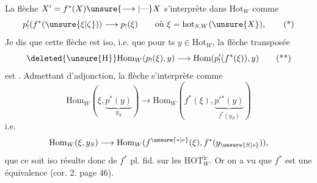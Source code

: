 
La flèche $X'=f^*(X)\unsure{\longrightarrow|\text{---}}X$ s'interprète dans $\mathrm{Hot}_W$ comme
\[
p'_!(f^*(\unsure{\xi|\zeta}))\longrightarrow p_!(\xi)\qquad\text{où }\xi=\mathrm{hot}_{S,W}(\unsure{X}),\tag*{(*)}
\]
Je dis que cette flèche est iso, i.e. que pour ts $y\in\mathrm{Hot}_W$, la flèche transposée
\[
\deleted{\unsure{\mathrm H}}\mathrm{Hom}_W(p_!(\xi),y)\longrightarrow\mathrm{Hom}(p'_!(f^*(\xi)),y)\tag*{(**)}
\]
est . Admettant  d'adjonction, la flèche \unsure{(**)} s'interprète comme
\[
\mathrm{Hom}_W(\xi,\underbrace{p^*(y)}_{y_S})\longrightarrow\mathrm{Hom}_W(f^*(\xi),\underbrace{p'{}^*(y)}_{f^*(y_S)})
\]
i.e.
\[
\mathrm{Hom}_W(\xi,y_S)\longrightarrow\mathrm{Hom}_W(f^{\unsure{*|e}}(\xi),f^*(y_{\unsure{S|s}})),
\]
que ce soit iso résulte donc de $f^*$ pl. fid. sur les $\mathrm{HOT}_W^{\mathrm{lc}}$. Or on a vu que $f^*$ est une équivalence (cor. 2. page 46).
